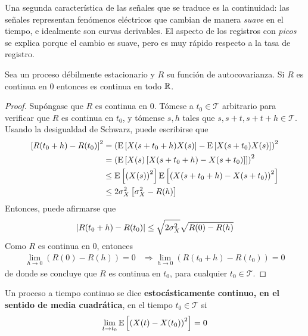Una segunda característica de las señales que se traduce es la continuidad: las señales representan fenómenos eléctricos que cambian de manera \textit{suave} en el tiempo, e idealmente son curvas derivables.
%
El aspecto de los registros con \textit{picos} se explica porque el cambio es suave, pero es muy rápido respecto a la tasa de registro.

\begin{proposicion}
Sea \xt un proceso débilmente estacionario y $R$ su función de autocovarianza. Si $R$ es continua
en 0 entonces es continua en todo $\mathbb{R}$.
\end{proposicion}

\begin{proof}
Supóngase que $R$ es continua en 0. Tómese a $t_0 \in \mathcal{T}$ arbitrario para verificar que $R$ es continua en $t_0$, y tómense $s,h$ tales que $s,s+t,s+t+h \in\mathcal{T}$. Usando la desigualdad de Schwarz, puede escribirse que
\begin{align*}
\left[ R(t_0+h) -R(t_0) \right]^{2} 
&= \left( \mathrm{E}\left[ X(s+t_0+h)X(s) \right] - \mathrm{E}\left[ X(s+t_0)X(s) \right] \right)^{2}  \\
&= \left( \mathrm{E}\left[ X(s)\left[ X(s+t_0+h) - X(s+t_0) \right] \right] \right)^{2} \\
&\leq \mathrm{E}\left[ \left( X(s) \right)^{2} \right] \mathrm{E}\left[ \left( X(s+t_0+h) - X(s+t_0) \right)^{2} \right] \\
&\leq 2 \sigma_X^{2} \left[ \sigma_X^{2} - R(h) \right]
\end{align*}
Entonces, puede afirmarse que
\begin{equation*}
\left| R(t_0+h) -R(t_0) \right| \leq \sqrt{2 \sigma_X^{2}} \sqrt{R(0) - R(h)}
\end{equation*}
Como $R$ es continua en 0, entonces 
\begin{align*}
\lim_{h\rightarrow 0} (R(0)-R(h)) = 0 &\Rightarrow \lim_{h\rightarrow 0} (R(t_0+h)-R(t_0)) = 0
\end{align*}
de donde se concluye que $R$ es continua en $t_0$, para cualquier $t_0\in \mathcal{T}$.
\end{proof}    

\begin{definicion}%
Un proceso a tiempo continuo \xt se dice \textbf{estocásticamente continuo, en el sentido de media cuadrática}, en el tiempo $t_0\in \mathcal{T}$ si
\begin{equation*}
\lim_{t \rightarrow t_0} \mathrm{E}\left[ \left( X(t) - X(t_0) \right)^{2} \right] = 0
\end{equation*}
\label{cont_est}
\end{definicion}

